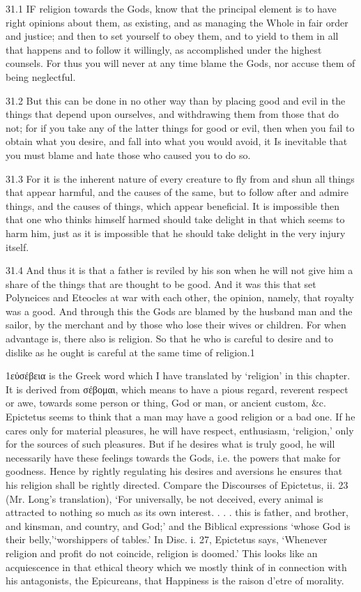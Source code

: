    31.1   IF religion towards the Gods, know that the principal element is to have right opinions about them, as existing, and as managing the Whole in fair order and justice; and then to set yourself to obey them, and to yield to them in all that happens and to follow it willingly, as accomplished under the highest counsels. For thus you will never at any time blame the Gods, nor accuse them of being neglectful.

   31.2   But this can be done in no other way than by placing good and evil in the things that depend upon ourselves, and withdrawing them from those that do not; for if you take any of the latter things for good or evil, then when you fail to obtain what you desire, and fall into what you would avoid, it Is inevitable that you must blame and hate those who caused you to do so.

   31.3   For it is the inherent nature of every creature to fly from and shun all things that appear harmful, and the causes of the same, but to follow after and admire things, and the causes of things, which appear beneficial. It is impossible then that one who thinks himself harmed should take delight in that which seems to harm him, just as it is impossible that he should take delight in the very injury itself.

   31.4    And thus it is that a father is reviled by his son when he will not give him a share of the things that are thought to be good. And it was this that set Polyneices and Eteocles at war with each other, the opinion, namely, that royalty was a good. And through this the Gods are blamed by the husband man and the sailor, by the merchant and by those who lose their wives or children.  For when advantage is, there also is religion. So that he who is careful to desire and to dislike as he ought is careful at the same time of religion.1

   1εὐσέβεια is the Greek word which I have translated by ‘religion’ in this chapter. It is derived from σέβομαι, which means to have a pious regard, reverent respect or awe, towards some person or thing, God or man, or ancient custom, &c. Epictetus seems to think that a man may have a good religion or a bad one. If he cares only for material pleasures, he will have respect, enthusiasm, ‘religion,’ only for the sources of such pleasures. But if he desires what is truly good, he will necessarily have these feelings towards the Gods, i.e. the powers that make for goodness. Hence by rightly regulating his desires and aversions he ensures that his religion shall be rightly directed. Compare the Discourses of Epictetus, ii. 23 (Mr. Long’s translation),  ‘For universally, be not deceived, every animal is attracted to nothing so much as its own interest. . . . this is father, and brother, and kinsman, and country, and God;’ and the Biblical expressions ‘whose God is their belly,’‘worshippers of tables.’ In Disc. i. 27, Epictetus says, ‘Whenever religion and profit do not coincide, religion is doomed.’ This looks like an acquiescence in that ethical theory which we mostly think of in connection with his antagonists, the Epicureans, that Happiness is the raison d’etre of morality.

